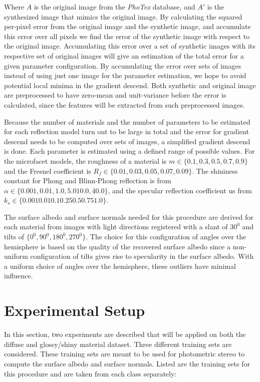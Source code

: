 Where $A$ is the original image from the {\it PhoTex} database, and $A'$ is the synthesized image that mimics the original image. By calculating the squared per-pixel error from the original image and the synthetic image, and accumulate this error over all pixels we find the error of the synthetic image with respect to the original image. Accumulating this error over a set of synthetic images with its respective set of original images will give an estimation of the total error for a given parameter configuration. By accumulating the error over sets of images instead of using just one image for the parameter estimation, we hope to avoid potential local minima in the gradient descend. Both synthetic and original image are preprocessed to have zero-mean and unit-variance before the error is calculated, since the features will be extracted from such preprocessed images.

Because the number of materials and the number of parameters to be estimated for each reflection model turn out to be large in total and the error for gradient descend needs to be computed over sets of images, a simplified gradient descend is done. Each parameter is estimated using a defined range of possible values. For the microfacet models, the roughness of a material is $m \in \{0.1, 0.3, 0.5, 0.7, 0.9\}$ and the Fresnel coefficient is $R_f \in \{0.01, 0.03, 0.05, 0.07, 0.09\}$. The shininess constant for Phong and Blinn-Phong reflection is from $\alpha \in \{0.001, 0.01, 1.0, 5.0 10.0, 40.0\}$, and the specular reflection coefficient us from $k_s \in \{0.001 0.01 0.1 0.25 0.5 0.75 1.0\}$. 

The surface albedo and surface normals needed for this procedure are derived for each material from images with light directions registered with a slant of $30^0$ and tilts of $\{0^0, 90^0, 180^0, 270^0\}$. The choice for this configuration of angles over the hemisphere is based on the quality of the recovered surface albedo since a non-uniform configuration of tilts gives rise to specularity in the surface albedo. With a uniform choice of angles over the hemisphere, these outliers have minimal influence.

\section{Experimental Setup}\label{sec:Experiments}
In this section, two experiments are described that will be applied on both the diffuse and glossy/shiny material dataset. Three different training sets are considered. These training sets are meant to be used for photometric stereo to compute the surface albedo and surface normals. Listed are the training sets for this procedure and are taken from each class separately:

